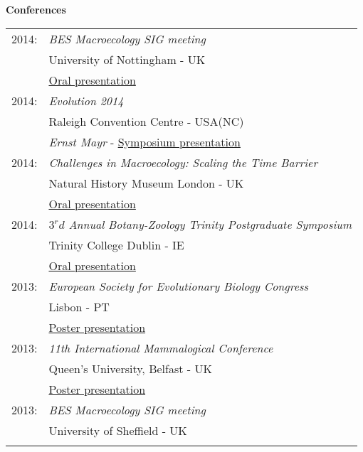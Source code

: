 \documentclass[10pt,a4paper]{article}
\begin{document}
{\raggedright\textbf{Conferences}\\[1.5ex]
\begin{tabular}{ll}
2014: & \textit{BES Macroecology SIG meeting} \\
& University of Nottingham - UK\\
& \href{http://figshare.com/articles/Trees_with_fossil_and_living_species_the_data_issue/1056307}{Oral presentation} \\
2014: & \textit{Evolution 2014}\\
& Raleigh Convention Centre - USA(NC)\\
& \textit{Ernst Mayr} - \href{http://figshare.com/articles/Total_evidence_phylogenies_the_missing_data_issue/1086216}{Symposium presentation}\\ 
2014: & \textit{Challenges in Macroecology: Scaling the Time Barrier}\\
& Natural History Museum London - UK\\
& \href{http://figshare.com/articles/Trees_with_fossil_and_living_species_the_data_issue/1056307}{Oral presentation} \\
2014: & \textit{$3^rd$ Annual Botany-Zoology Trinity Postgraduate Symposium}\\
& Trinity College Dublin - IE\\
& \href{http://figshare.com/articles/Total_evidence_phylogenies_the_missing_data_issue/1086216}{Oral presentation} \\
2013: & \textit{European Society for Evolutionary Biology Congress}\\
& Lisbon - PT \\
& \href{http://figshare.com/articles/Combining_fossils_and_molecular_phylogenies/1056300}{Poster presentation} \\
2013: & \textit{11th International Mammalogical Conference} \\
& Queen’s University, Belfast - UK \\
& \href{http://figshare.com/articles/Combining_fossils_and_molecular_phylogenies/1056300}{Poster presentation} \\
2013: & \textit{BES Macroecology SIG meeting} \\
& University of Sheffield - UK \\
& \\
\end{tabular}
\bigskip

}
\end{document}
